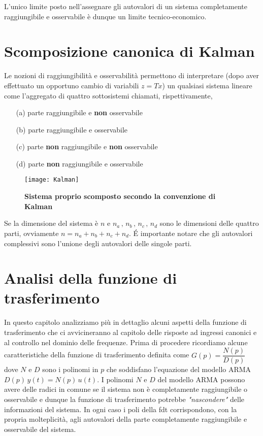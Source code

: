 \documentclass[a4paper]{article}
\begin{document}
	L'unico limite posto nell'assegnare gli autovalori di un sistema completamente raggiungibile e osservabile è dunque un limite tecnico-economico.
	
	\section{Scomposizione canonica di Kalman}
	Le nozioni di raggiungibilità e osservabilità permettono di interpretare (dopo aver effettuato un opportuno cambio di variabili $z=Tx$) un qualsiasi sistema lineare come l'aggregato di quattro sottosistemi chiamati, rispettivamente, \label{Kalman}
	\begin{enumerate}
		\item [(a)] parte raggiungibile e \textbf{non} osservabile
		\item [(b)] parte raggiungibile e osservabile
		\item [(c)] parte \textbf{non} raggiungibile e \textbf{non} osservabile
		\item [(d)] parte \textbf{non} raggiungibile e osservabile
	\end{enumerate}
	\begin{figure}[htbp]
		\centering
		\texttt{[image: Kalman]}%
		\caption{\textbf{Sistema proprio scomposto secondo la convenzione di Kalman}}
	\end{figure}
	Se la dimensione del sistema è $n$ e $n_a\,,\,n_b\,,\,n_c\,,\,n_d$ sono le dimensioni delle quattro parti, ovviamente $n=n_a+n_b+n_c+n_d$.
	\'E importante notare che gli autovalori complessivi sono l'unione degli autovalori delle singole parti. 
	
	
	\section{Analisi della funzione di trasferimento}
	In questo capitolo analizziamo più in dettaglio alcuni aspetti della funzione di trasferimento che ci avvicineranno al capitolo delle risposte ad ingressi canonici e al controllo nel dominio delle frequenze.
	Prima  di procedere ricordiamo alcune caratteristiche della funzione di trasferimento definita come $G(p)=\dfrac{N(p)}{D(p)}$ dove $N$ e $D$ sono i polinomi in $p$ che soddisfano l'equazione del modello ARMA $D(p)\,y(t)=N(p)\,u(t)$. I polinomi $N$ e $D$ del modello ARMA possono avere delle radici in comune se il sistema non è completamente raggiungibile o osservabile e dunque la funzione di trasferimento potrebbe \emph{"nascondere"} delle informazioni del sistema. In ogni caso i poli della fdt corrispondono, con la propria molteplicità, agli autovalori della parte completamente raggiungibile e osservabile del sistema.
	
\end{document}
